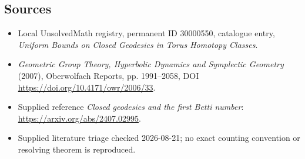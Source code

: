 \documentclass[11pt]{article}
\begin{document}
\subsection{Sources}
\begin{itemize}
\item Local UnsolvedMath registry, permanent ID 30000550, catalogue entry, \emph{Uniform Bounds on Closed Geodesics in Torus Homotopy Classes}.
\item \emph{Geometric Group Theory, Hyperbolic Dynamics and Symplectic Geometry} (2007), Oberwolfach Reports, pp. 1991--2058, DOI \url{https://doi.org/10.4171/owr/2006/33}.
\item Supplied reference \emph{Closed geodesics and the first Betti number}: \url{https://arxiv.org/abs/2407.02995}.
\item Supplied literature triage checked 2026-08-21; no exact counting convention or resolving theorem is reproduced.
\end{itemize}
\end{document}
